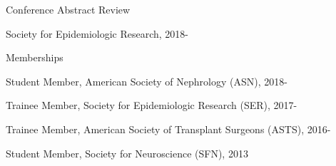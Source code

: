 \documentclass[10pt]{article}
\renewcommand{\section}[1]{\pagebreak[3]%
    \vspace{1.3\baselineskip}%
    \phantomsection\addcontentsline{toc}{section}{#1}%
    \noindent\llap{\scshape\smash{\parbox[t]{\marginparwidth}{\hyphenpenalty=10000\raggedright #1}}}%
    \vspace{-\baselineskip}\par}
\begin{document}
Conference Abstract Review

\begin{innerlist}

\item Society for Epidemiologic Research, 2018-

\end{innerlist}

\vspace{2mm}

Memberships

\begin{innerlist}

\item Student Member, American Society of Nephrology (ASN), 2018-
\item Trainee Member, Society for Epidemiologic Research (SER), 2017-
\item Trainee Member, American Society of Transplant Surgeons (ASTS), 2016-
\item Student Member, Society for Neuroscience (SFN), 2013

\end{innerlist}

\end{document}
